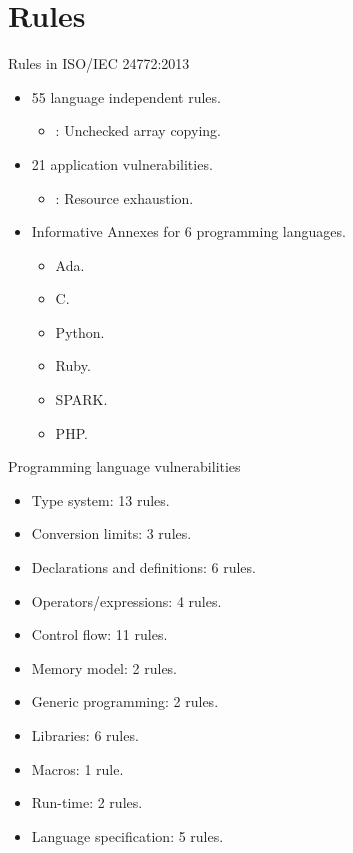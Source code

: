 \section{Rules}

\begin{frame}[t]{Rules in ISO/IEC 24772:2013}
\begin{itemize}
  \item 55 language independent rules.
    \begin{itemize}
      \item {}: Unchecked array copying.
    \end{itemize}

  \vfill\pause
  \item 21 application vulnerabilities.
    \begin{itemize}
      \item {}: Resource exhaustion.
    \end{itemize}

  \vfill\pause
  \item Informative Annexes for 6 programming languages.
    \begin{itemize}
         \item Ada.
         \item C.
         \item Python.
         \item Ruby.
         \item SPARK.
         \item PHP.
    \end{itemize}
\end{itemize}
\end{frame}

\begin{frame}[t]{Programming language vulnerabilities}
\begin{itemize}
  \item Type system: 13 rules.
  \item Conversion limits: 3 rules.
  \item Declarations and definitions: 6 rules.
  \item Operators/expressions: 4 rules.
  \item Control flow: 11 rules.
  \item Memory model: 2 rules.
  \item Generic programming: 2 rules.
  \item Libraries: 6 rules.
  \item Macros: 1 rule.
  \item Run-time: 2 rules.
  \item Language specification: 5 rules.
\end{itemize}
\end{frame}


